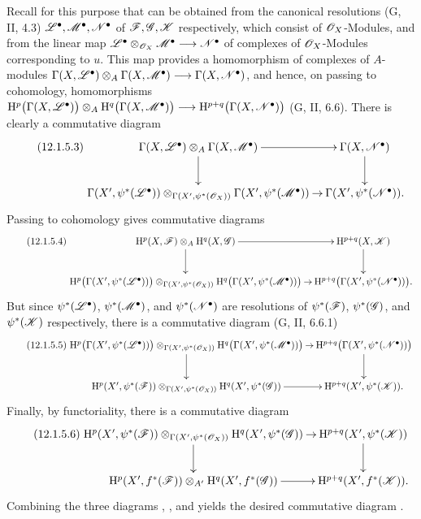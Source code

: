 \begin{env}[12.1.5]
Recall for this purpose that  can be obtained from
the canonical resolutions (G, II, 4.3)
$\mathscr{L}^\bullet,\mathscr{M}^\bullet,\mathscr{N}^\bullet$ of
$\mathscr{F},\mathscr{G},\mathscr{K}$ respectively, which consist of
$\mathscr{O}_X$-Modules, and from the linear map $\mathscr{L}^\bullet\otimes_{\mathscr{O}_X}\mathscr{M}^\bullet
\longrightarrow
\mathscr{N}^\bullet$
of complexes of $\mathscr{O}_X$-Modules corresponding to $u$.
This map provides a homomorphism of complexes of $A$-modules $\Gamma(X,\mathscr{L}^\bullet)\otimes_A\Gamma(X,\mathscr{M}^\bullet)
\longrightarrow
\Gamma(X,\mathscr{N}^\bullet)$,
and hence, on passing to cohomology, homomorphisms $\mathrm{H}^p\bigl(\Gamma(X,\mathscr{L}^\bullet)\bigr)
\otimes_A
\mathrm{H}^q\bigl(\Gamma(X,\mathscr{M}^\bullet)\bigr)
\longrightarrow
\mathrm{H}^{p+q}\bigl(\Gamma(X,\mathscr{N}^\bullet)\bigr)$
(G, II, 6.6).
There is clearly a commutative diagram
\[
\label{0.12.1.5.3}
\tag{12.1.5.3}
  \xymatrix@C=8pt{
    \Gamma(X,\sh{L}^\bullet)\otimes_A
      \Gamma(X,\sh{M}^\bullet)
      \ar[r]\ar[d]
      & \Gamma(X,\sh{N}^\bullet)\ar[d]\\
    \Gamma(X',\psi^*(\sh{L}^\bullet))
      \otimes_{\Gamma(X',\psi^*(\sh{O}_X))}
      \Gamma(X',\psi^*(\sh{M}^\bullet))
      \ar[r]
      & \Gamma(X',\psi^*(\sh{N}^\bullet)).
  }
\]
Passing to cohomology gives commutative diagrams
\[
\label{0.12.1.5.4}
\tag{12.1.5.4}
  \xymatrix@C=7pt{
    \HH^p(X,\sh{F})\otimes_A\HH^q(X,\sh{G})
      \ar[r]\ar[d]
      & \HH^{p+q}(X,\sh{K})\ar[d]\\
    \HH^p\bigl(\Gamma(X',\psi^*(\sh{L}^\bullet))\bigr)
      \otimes_{\Gamma(X',\psi^*(\sh{O}_X))}
      \HH^q\bigl(\Gamma(X',\psi^*(\sh{M}^\bullet))\bigr)
      \ar[r]
      & \HH^{p+q}\bigl(\Gamma(X',\psi^*(\sh{N}^\bullet))\bigr).
  }
\]
But since
$\psi^*(\mathscr{L}^\bullet)$,
$\psi^*(\mathscr{M}^\bullet)$, and
$\psi^*(\mathscr{N}^\bullet)$
are resolutions of
$\psi^*(\mathscr{F})$,
$\psi^*(\mathscr{G})$, and
$\psi^*(\mathscr{K})$ respectively, there is a commutative diagram
(G, II, 6.6.1)
\[
\label{0.12.1.5.5}
\tag{12.1.5.5}
  \xymatrix@C=7pt{
    \HH^p\bigl(\Gamma(X',\psi^*(\sh{L}^\bullet))\bigr)
      \otimes_{\Gamma(X',\psi^*(\sh{O}_X))}
      \HH^q\bigl(\Gamma(X',\psi^*(\sh{M}^\bullet))\bigr)
      \ar[r]\ar[d]
      & \HH^{p+q}\bigl(\Gamma(X',\psi^*(\sh{N}^\bullet))\bigr)
        \ar[d]\\
    \HH^p(X',\psi^*(\sh{F}))
      \otimes_{\Gamma(X',\psi^*(\sh{O}_X))}
      \HH^q(X',\psi^*(\sh{G}))
      \ar[r]
      & \HH^{p+q}(X',\psi^*(\sh{K})).
  }
\]
Finally, by functoriality, there is a commutative diagram
\[
\label{0.12.1.5.6}
\tag{12.1.5.6}
  \xymatrix@C=7pt{
    \HH^p(X',\psi^*(\sh{F}))
      \otimes_{\Gamma(X',\psi^*(\sh{O}_X))}
      \HH^q(X',\psi^*(\sh{G}))
      \ar[r]\ar[d]
      & \HH^{p+q}(X',\psi^*(\sh{K}))\ar[d]\\
    \HH^p(X',f^*(\sh{F}))\otimes_{A'}
      \HH^q(X',f^*(\sh{G}))
      \ar[r]
      & \HH^{p+q}(X',f^*(\sh{K})).
  }
\]
Combining the three diagrams ,
, and  yields the desired
commutative diagram .
\end{env}

